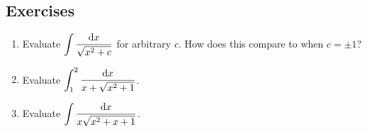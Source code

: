 \subsection*{Exercises}

\begin{enumerate}
    \item Evaluate $\displaystyle \int \frac{\textrm{d}x}{\sqrt{x^2+c}}$ for arbitrary $c$. How does this compare to when $c=\pm 1$?
    \item Evaluate $\displaystyle \int_1^2 \frac{\textrm{d}x}{x+\sqrt{x^2+1}}$.
    \item Evaluate $\displaystyle \int \frac{\textrm{d}x}{x\sqrt{x^2+x+1}}$.
\end{enumerate}

